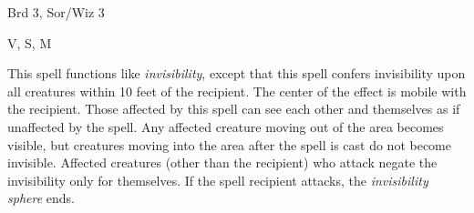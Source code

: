 
\begin{description*}
\item[Level:] Brd 3, Sor/Wiz 3
\item[Components:] V, S, M
\end{description*}

This spell functions like \textit{invisibility}, except that this spell confers
invisibility upon all creatures within 10 feet of the recipient. The center of
the effect is mobile with the recipient.
Those affected by this spell can see each other and themselves as if unaffected
by the spell. Any affected creature moving out of the area becomes visible, but
creatures moving into the area after the spell is cast do not become invisible.
Affected creatures (other than the recipient) who attack negate the invisibility
only for themselves. If the spell recipient attacks, the \textit{invisibility sphere
}ends.